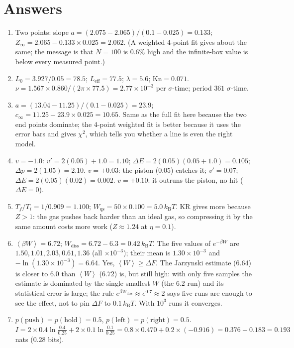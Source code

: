 \documentclass[11pt,a4paper]{article}
\newcommand{\kT}{k_{\mathrm B}T}
\newcommand{\avg}[1]{\left\langle #1 \right\rangle}
\begin{document}
\section{Answers}
\label{sec:answers}
\begin{enumerate}[label=\textbf{\arabic*.},nosep,itemsep=3pt]
\item Two points: slope $a = (2.075-2.065)/(0.1-0.025) = 0.133$; $Z_\infty = 2.065 - 0.133\times0.025 = 2.062$. (A weighted 4-point fit gives about the same; the message is that $N = 100$ is $0.6\%$ high and the infinite-box value is below every measured point.)
\item $L_0 = 3.927/0.05 = 78.5$; $L_{\mathrm{eff}} = 77.5$; $\lambda = 5.6$; $\mathrm{Kn} = 0.071$. $\nu = 1.567\times0.860/(2\pi\times77.5) = 2.77\times10^{-3}$ per $\sigma$-time; period $361$ $\sigma$-time.
\item $a = (13.04-11.25)/(0.1-0.025) = 23.9$; $c_\infty = 11.25 - 23.9\times0.025 = 10.65$. Same as the full fit here because the two end points dominate; the 4-point weighted fit is better because it uses the error bars and gives $\chi^2$, which tells you whether a line is even the right model.
\item $v = -1.0$: $v' = 2(0.05)+1.0 = 1.10$; $\Delta E = 2(0.05)(0.05+1.0) = 0.105$; $\Delta p = 2(1.05) = 2.10$. $v = +0.03$: the piston (0.05) catches it; $v' = 0.07$; $\Delta E = 2(0.05)(0.02) = 0.002$. $v = +0.10$: it outruns the piston, no hit ($\Delta E = 0$).
\item $T_f/T_i = 1/0.909 = 1.100$; $W_{\mathrm{qs}} = 50\times0.100 = 5.0\,\kT$. KR gives more because $Z>1$: the gas pushes back harder than an ideal gas, so compressing it by the same amount costs more work ($Z\approx1.24$ at $\eta = 0.1$).
\item $\avg{\beta W} = 6.72$; $W_{\mathrm{diss}} = 6.72-6.3 = 0.42\,\kT$. The five values of $e^{-\beta W}$ are $1.50, 1.01, 2.03, 0.61, 1.36$ (all $\times10^{-3}$); their mean is $1.30\times10^{-3}$ and $-\ln(1.30\times10^{-3}) = 6.64$. Yes, $\avg W\ge\Delta F$. The Jarzynski estimate ($6.64$) is closer to $6.0$ than $\avg W$ ($6.72$) is, but still high: with only five samples the estimate is dominated by the single smallest $W$ (the $6.2$ run) and its statistical error is large; the rule $e^{\beta W_{\mathrm{diss}}} \approx e^{0.7}\approx2$ says five runs are enough to see the effect, not to pin $\Delta F$ to $0.1\,\kT$. With $10^3$ runs it converges.
\item $p(\text{push}) = p(\text{hold}) = 0.5$, $p(\text{left}) = p(\text{right}) = 0.5$. $I = 2\times0.4\ln\frac{0.4}{0.25} + 2\times0.1\ln\frac{0.1}{0.25} = 0.8\times0.470 + 0.2\times(-0.916) = 0.376 - 0.183 = 0.193$ nats ($0.28$ bits).
\end{enumerate}
\end{document}
